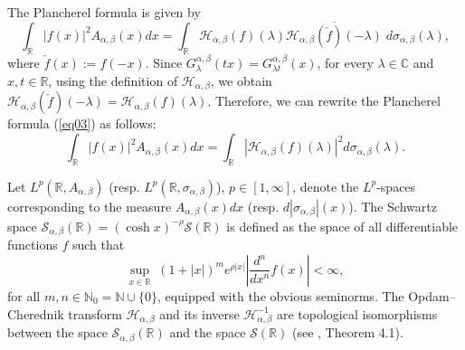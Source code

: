 \documentclass[a4paper,11pt, reqno]{amsart}
\theoremstyle{plain}
\theoremstyle{definition}
\theoremstyle{remark}
\def \R{{\mathbb R}}
\def \N{{\mathbb N}}
\def \C{{\mathbb C}}
\def\R{\mathbb R}
\def \S{{\mathcal S}}
\def \H{{\mathcal H}}
\begin{document}
The Plancherel formula is given by 
\begin{equation}\label{eq03}
\int_{\R} |f(x)|^2 A_{\alpha, \beta}(x) dx=\int_\R \H_{\alpha, \beta} (f)(\lambda) \overline{\H_{\alpha, \beta} ( \check{f})(-\lambda)} \; d \sigma_{\alpha, \beta} (\lambda),
\end{equation}
where $\check{f}(x):=f(-x)$. Since $G^{\alpha, \beta}_{\lambda }(tx)=G^{\alpha, \beta}_{\lambda  t}(x)$, for every $ \lambda \in \C $ and $x, t \in  \R$, using the definition of $\mathcal{H}_{\alpha, \beta}$, we obtain $\mathcal{H}_{\alpha, \beta}(\check{f})(-\lambda)=\mathcal{H}_{\alpha, \beta}(f)(\lambda)$. Therefore, we can rewrite the Plancherel formula (\ref{eq03}) as follows: 
\begin{equation}\label{newpf}
\int_{\mathbb{R}}|f(x)|^{2} A_{\alpha, \beta}(x) d x=\int_{\mathbb{R}} \left| \mathcal{H}_{\alpha, \beta}(f)(\lambda) \right|^2 d \sigma_{\alpha, \beta}(\lambda).
\end{equation}

Let $L^p(\R,A_{\alpha, \beta} )$ (resp. $L^p(\R, \sigma_{\alpha, \beta} )$), $p \in [1, \infty] $, denote the $L^p$-spaces corresponding to the measure $A_{\alpha, \beta}(x) dx$ (resp. $d | \sigma_{\alpha, \beta} |(x)$). The Schwartz space $\S_{\alpha, \beta}(\R )=(\cosh x )^{-\rho} \S(\R)$ is defined as the space of all differentiable functions $f$ such that 
$$ \sup_{x \in \R} \; (1+|x|)^m e^{\rho |x|} \left|\frac{d^n}{dx^n} f(x) \right|<\infty,$$ 
for all $m, n \in \N_0 = \N \cup \{0\}$, equipped with the obvious seminorms. The Opdam--Cherednik transform $\H_{\alpha, \beta}$ and its inverse $\H_{\alpha, \beta}^{-1}$ are topological isomorphisms between the space $\S_{\alpha, \beta}(\R )$ and the space $\S(\R)$ (see \cite{sch08}, Theorem 4.1).
\end{document}
